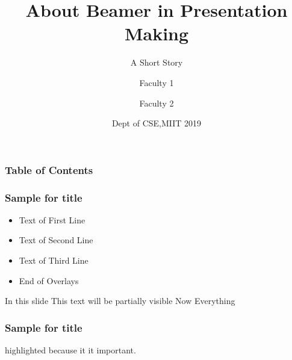 \documentclass{beamer}
\title[About Beamer]
	{About Beamer in Presentation Making}
\subtitle{A Short Story}
\author[Author 1,Author 2]
	{Faculty 1\inst{1} \and Faculty 2\inst{2}}
\institute{MIT,MAHE,Manipal}
\date[July-December 2019]{Dept of CSE,MIIT 2019}
\begin{document}
\frame{\titlepage}
\begin{frame}
	\frametitle{Table of Contents}
	\tableofcontents
\end{frame}

\begin{frame}
	\frametitle{Sample for title}
		\begin{itemize}
		\item <1->Text of First Line \Pause
		\item <2->Text of Second Line \Pause
		\item <3->Text of Third Line \Pause
		\item <4->End of Overlays
		\end{itemize}
\end{frame}


\begin{frame}
	In this slide \Pause
	This text will be partially visible \Pause
	Now Everything 
\end{frame}

\begin{frame}
	\frametitle{Sample for title}
	\alert{highlighted} because it it important.
\end{frame}
\end{document}
